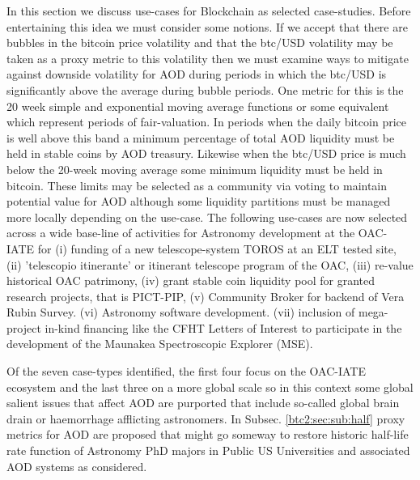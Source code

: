 \documentclass[final,5p,times,twocolumn,authoryear]{elsarticle}
\begin{document}
In this section we discuss use-cases for Blockchain as selected case-studies. Before entertaining this idea we must consider some notions. If we accept that there are bubbles in the bitcoin price volatility and that the btc/USD volatility may be taken as a proxy metric to this volatility then we must examine ways to mitigate against downside volatility for AOD during periods in which the btc/USD is significantly above the average during bubble periods. One metric for this is the 20 week simple and exponential moving average functions or some equivalent which represent periods of fair-valuation. In periods when the daily bitcoin price is well above this band a minimum percentage of total AOD liquidity must be held in stable coins by AOD treasury. Likewise when the btc/USD price is much below the 20-week moving average some minimum liquidity must be held in bitcoin. These limits may be selected as a community via voting to maintain potential value for AOD although some liquidity partitions must be managed more locally depending on the use-case. The following use-cases are now selected across a wide base-line of activities for Astronomy development at the OAC-IATE for (i) funding of a new telescope-system TOROS at an ELT tested site, (ii) 'telescopio itinerante' or itinerant telescope program of the OAC, (iii) re-value historical OAC patrimony, (iv) grant stable coin liquidity pool for granted research projects, that is PICT-PIP, (v) Community Broker for backend of Vera Rubin Survey. (vi) Astronomy software development. (vii) inclusion of mega-project in-kind financing like the CFHT
Letters of Interest to participate in the development of the Maunakea
Spectroscopic Explorer (MSE). 

Of the seven case-types identified, the first four focus on the OAC-IATE ecosystem and the last three on a more global scale so in this context some global salient issues that affect AOD are purported that include so-called global brain drain or haemorrhage afflicting astronomers. In Subsec. \ref{btc2:sec:sub:half} proxy metrics for AOD are proposed that might go someway to restore historic half-life rate function of Astronomy PhD majors in Public US Universities and associated AOD systems as considered. 
\end{document}
